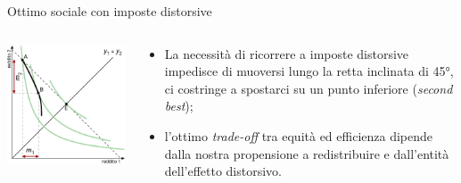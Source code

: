 \documentclass[aspectratio=64,12pt]{beamer}
\begin{document}
\begin{frame}{Ottimo sociale con imposte distorsive}
\begin{columns}
\begin{column}{.55\columnwidth}
\begin{center}
\includegraphics[width=\textwidth]{./figure/fbs-color-6.pdf}
\end{center}
\end{column}


\begin{column}{.45\columnwidth}
\begin{itemize}
\item La necessità di ricorrere a imposte distorsive impedisce di muoversi lungo la retta inclinata di 45°, ci costringe a spostarci su un punto inferiore (\emph{second best});
\item l'ottimo \emph{trade-off} tra equità ed efficienza dipende dalla nostra propensione a redistribuire e dall'entità dell'effetto distorsivo.
\end{itemize}
\end{column}
\end{columns}
\end{frame}
\end{document}
